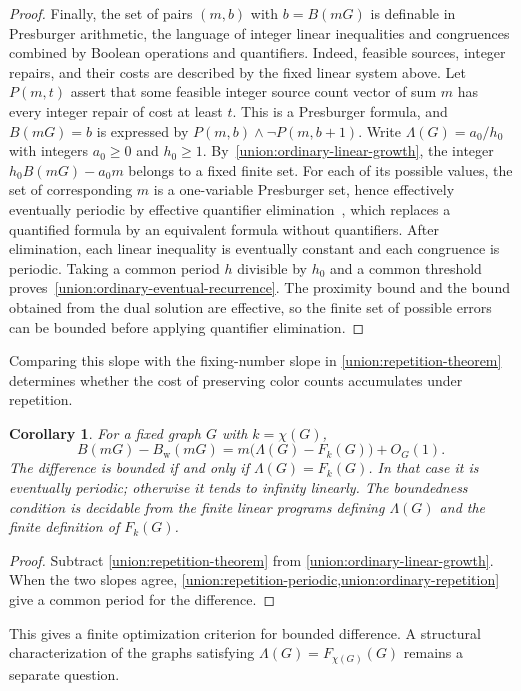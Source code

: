 \documentclass[10pt,a4paper]{amsart}
\numberwithin{equation}{section}
\newtheorem{corollary}[theorem]{Corollary}
\theoremstyle{definition}
\theoremstyle{remark}
\begin{document}
\begin{proof}
Finally, the set of pairs $(m,b)$ with $b=B(mG)$ is definable in
Presburger arithmetic, the language of integer linear inequalities
and congruences combined by Boolean operations and quantifiers.
Indeed, feasible sources,
integer repairs, and their costs are described by the fixed linear
system above. Let $P(m,t)$ assert that some feasible integer source
count vector of sum $m$ has every integer repair of cost at least $t$.
This is a Presburger formula, and $B(mG)=b$ is expressed by
$P(m,b)\wedge\neg P(m,b+1)$. Write $\Lambda(G)=a_0/h_0$ with
integers $a_0\ge0$ and $h_0\ge1$.
By~\eqref{union:ordinary-linear-growth}, the integer
$h_0B(mG)-a_0m$ belongs to a fixed finite set.
For each of its possible values, the set of corresponding $m$ is a
one-variable Presburger set, hence effectively eventually periodic
by effective quantifier elimination~\cite{ginsburg1966,haase2024},
which replaces a quantified formula by an equivalent formula without
quantifiers. After elimination, each
linear inequality is eventually constant and each congruence is
periodic. Taking a common period $h$ divisible by $h_0$ and a common
threshold proves~\eqref{union:ordinary-eventual-recurrence}.
The proximity bound and the bound obtained from the dual solution
are effective, so
the finite set of possible errors can be bounded before applying
quantifier elimination.
\end{proof}

Comparing this slope with the fixing-number slope in
\cref{union:repetition-theorem} determines whether the cost of preserving
color counts accumulates under repetition.

\begin{corollary}\label{union:repetition-gap}
For a fixed graph $G$ with $k=\chi(G)$,
\[
 B(mG)-B_{\mathrm w}(mG)
   =m\bigl(\Lambda(G)-F_k(G)\bigr)+O_G(1).
\]
The difference is bounded if and only if $\Lambda(G)=F_k(G)$.
In that case it is eventually periodic; otherwise it tends to
infinity linearly. The boundedness condition is decidable from the
finite linear programs defining $\Lambda(G)$ and the finite
definition of $F_k(G)$.
\end{corollary}
\begin{proof}
Subtract \cref{union:repetition-theorem} from
\eqref{union:ordinary-linear-growth}. When the two slopes agree,
\cref{union:repetition-periodic,union:ordinary-repetition} give a
common period for the difference.
\end{proof}

This gives a finite optimization criterion for bounded difference.
A structural characterization of the graphs satisfying
$\Lambda(G)=F_{\chi(G)}(G)$ remains a separate question.
\end{document}
